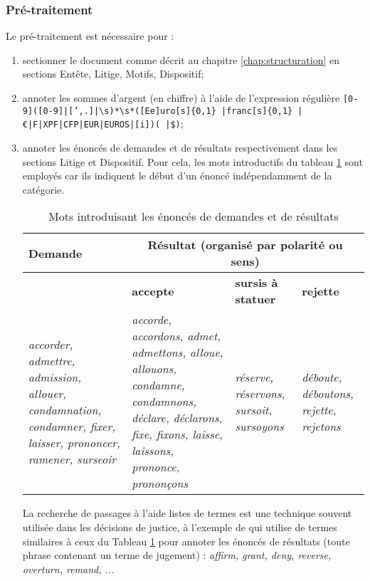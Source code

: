 \subsubsection{Pré-traitement}

Le pré-traitement est nécessaire pour :
\begin{enumerate}
	\item sectionner le document comme décrit au chapitre \ref{chap:structuration} en sections Entête, Litige, Motifs, Dispositif;
	\item annoter les sommes d'argent (en chiffre) à l'aide de l'expression régulière \og \texttt{[0-9]([0-9]|[',.]|\textbackslash s)*\textbackslash s*([Ee]uro[s]\{0,1\} |franc[s]\{0,1\} |\euro|F|XPF|CFP|EUR|EUROS|[i])( |\$)}\fg{};
	\item annoter les énoncés de demandes et de résultats respectivement dans les sections Litige et Dispositif. Pour cela, les mots introductifs du tableau \ref{tab:quanta:mots-introductifs} sont employés car ils indiquent le début d'un énoncé indépendamment de la catégorie.
	 
	\begin{table}[!htb]
		\centering
		\scriptsize
		\begin{tabular}{|p{}|p{}|p{}|p{}|}
			\hline
			\textbf{Demande} & \multicolumn{3}{c|}{\textbf{Résultat} (organisé par polarité ou sens)} \\ \hline
			& \textbf{accepte}  &\textbf{sursis à statuer} & \textbf{rejette}  \\ \hline
			\textit{accorder, admettre, admission, allouer, condamnation, condamner, fixer, laisser, prononcer, ramener, surseoir} & \textit{accorde, accordons, admet, admettons, alloue, allouons, condamne, condamnons, déclare, déclarons, fixe, fixons, laisse, laissons, prononce, prononçons} & \textit{réserve, réservons, sursoit, sursoyons} & \textit{déboute, déboutons, rejette, rejetons} \\ \hline
		\end{tabular}
		\caption{Mots introduisant les énoncés de demandes et de résultats}\label{tab:quanta:mots-introductifs}
	\end{table}

	La recherche de passages à l'aide listes de termes est une technique souvent utilisée dans les décisions de justice, à l'exemple de \cite{wyner2010extractlegalelts} qui utilise de termes similaires à ceux du Tableau \ref{tab:quanta:mots-introductifs} pour annoter les énoncés de résultats (toute phrase contenant un terme de jugement) : \textit{affirm, grant, deny, reverse, overturn, remand, ...}
\end{enumerate} 

